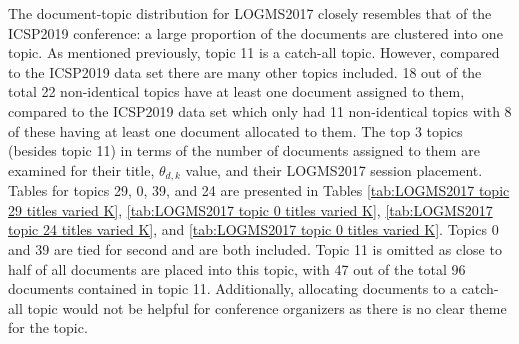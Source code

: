 \documentclass[a4paper, 12pt, twoside]{article}
\numberwithin{equation}{section} %
\begin{document}
The document-topic distribution for LOGMS2017 closely resembles that of the ICSP2019 conference: a large proportion of the documents are clustered into one topic. As mentioned previously, topic 11 is a catch-all topic. However, compared to the ICSP2019 data set there are many other topics included. 18 out of the total 22 non-identical topics have at least one document assigned to them, compared to the ICSP2019 data set which only had 11 non-identical topics with 8 of these having at least one document allocated to them. The top 3 topics (besides topic 11) in terms of the number of documents assigned to them are examined for their title, $\theta_{d,k}$ value, and their LOGMS2017 session placement. Tables for topics 29, 0, 39, and 24 are presented in Tables \ref{tab:LOGMS2017 topic 29 titles varied K}, \ref{tab:LOGMS2017 topic 0 titles varied K}, \ref{tab:LOGMS2017 topic 24 titles varied K}, and \ref{tab:LOGMS2017 topic 0 titles varied K}. Topics 0 and 39 are tied for second and are both included.  Topic 11 is omitted as close to half of all documents are placed into this topic, with 47 out of the total 96 documents contained in topic 11. Additionally, allocating documents to a catch-all topic would not be helpful for conference organizers as there is no clear theme for the topic.
\end{document}
